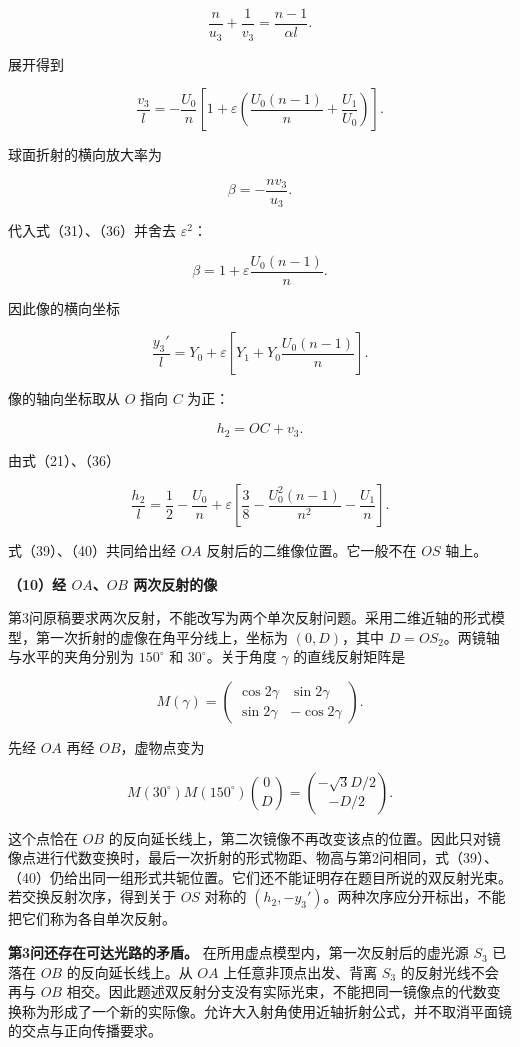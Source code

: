 \documentclass[12pt,a4paper,UTF8]{ctexart}
\begin{document}
\[
\frac n{u_3}+\frac1{v_3}
=\frac{n-1}{\alpha l}.
\tag{35}
\]

展开得到

\[
\boxed{
\frac{v_3}{l}
=-\frac{U_0}{n}
\left[
1+\varepsilon
\left(
\frac{U_0(n-1)}n+\frac{U_1}{U_0}
\right)
\right]
}.
\tag{36}
\]

球面折射的横向放大率为

\[
\beta=-\frac{nv_3}{u_3}.
\tag{37}
\]

代入式（31）、（36）并舍去 \(\varepsilon^2\)：

\[
\boxed{
\beta
=1+\varepsilon\frac{U_0(n-1)}n
}.
\tag{38}
\]

因此像的横向坐标

\[
\boxed{
\frac{y_3'}l
=Y_0
+\varepsilon
\left[
Y_1+Y_0\frac{U_0(n-1)}n
\right]
}.
\tag{39}
\]

像的轴向坐标取从 \(O\) 指向 \(C\) 为正：

\[
h_2=OC+v_3.
\]

由式（21）、（36）

\[
\boxed{
\frac{h_2}{l}
=\frac12-\frac{U_0}{n}
+\varepsilon
\left[
\frac38-\frac{U_0^2(n-1)}{n^2}-\frac{U_1}{n}
\right]
}.
\tag{40}
\]

式（39）、（40）共同给出经 \(OA\) 反射后的二维像位置。它一般不在 \(OS\)
轴上。

\textbf{（10）经 \(OA\)、\(OB\) 两次反射的像}

第3问原稿要求两次反射，不能改写为两个单次反射问题。采用二维近轴的形式模型，第一次折射的虚像在角平分线上，坐标为
\((0,D)\)，其中 \(D=OS_2\)。两镜轴与水平的夹角分别为 \(150^\circ\) 和
\(30^\circ\)。关于角度 \(\gamma\) 的直线反射矩阵是

\[M(\gamma)=\begin{pmatrix}\cos2\gamma&\sin2\gamma\\\sin2\gamma&-\cos2\gamma\end{pmatrix}.\]

先经 \(OA\) 再经 \(OB\)，虚物点变为

\[M(30^\circ)M(150^\circ)\binom0D=\binom{-\sqrt3D/2}{-D/2}.\]

这个点恰在 \(OB\)
的反向延长线上，第二次镜像不再改变该点的位置。因此只对镜像点进行代数变换时，最后一次折射的形式物距、物高与第2问相同，式（39）、（40）仍给出同一组形式共轭位置。它们还不能证明存在题目所说的双反射光束。若交换反射次序，得到关于
\(OS\) 对称的
\((h_2,-y_3')\)。两种次序应分开标出，不能把它们称为各自单次反射。

\textbf{第3问还存在可达光路的矛盾。}
在所用虚点模型内，第一次反射后的虚光源 \(S_3\) 已落在 \(OB\)
的反向延长线上。从 \(OA\) 上任意非顶点出发、背离 \(S_3\)
的反射光线不会再与 \(OB\)
相交。因此题述双反射分支没有实际光束，不能把同一镜像点的代数变换称为形成了一个新的实际像。允许大入射角使用近轴折射公式，并不取消平面镜的交点与正向传播要求。
\end{document}
